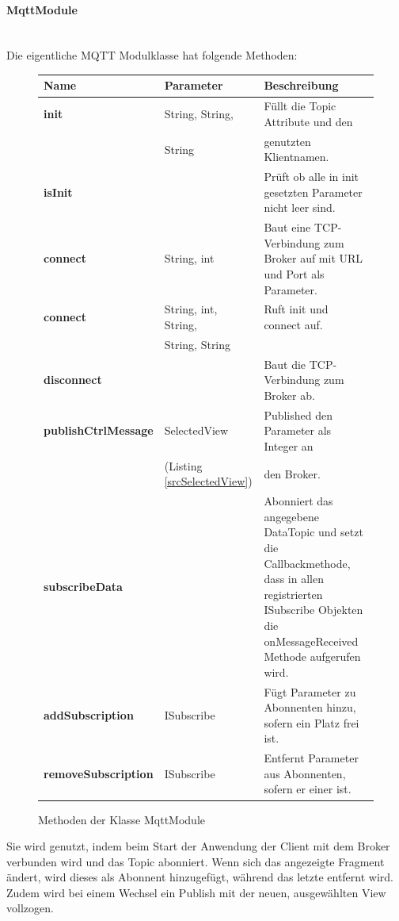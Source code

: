 \documentclass[12pt,oneside]{article}
\begin{document}
  	\paragraph{MqttModule}~\\
  	\label{par:mqtt}
		Die eigentliche MQTT Modulklasse hat folgende Methoden:\par
		\begin{figure}[tph!]
			\begin{tabularx}{\textwidth}{l l X}
				\textbf{Name} & \textbf{Parameter} & \textbf{Beschreibung}\\\hline
				\textbf{init} & String, String, & Füllt die Topic Attribute und den\\
				&  String & genutzten Klientnamen.\\\hline
				\textbf{isInit}&& Prüft ob alle in init gesetzten Parameter nicht leer sind.\\\hline
				\textbf{connect} & String, int & Baut eine TCP-Verbindung zum Broker auf mit URL und Port als Parameter.\\\hline
				\textbf{connect} & String, int, String, & Ruft init und connect auf.\\
				&  String, String &\\\hline
				\textbf{disconnect} && Baut die TCP-Verbindung zum Broker ab.\\\hline
				\textbf{publishCtrlMessage} & SelectedView & Published den Parameter als Integer an\\
				& (Listing \ref{srcSelectedView}) & den Broker.\\\hline
				\textbf{subscribeData} && Abonniert das angegebene DataTopic und setzt die Callbackmethode, dass in allen registrierten ISubscribe Objekten die onMessageReceived Methode aufgerufen wird.\\ \hline
				\textbf{addSubscription} & ISubscribe & Fügt Parameter zu Abonnenten hinzu, sofern ein Platz frei ist.\\\hline
				\textbf{removeSubscription} & ISubscribe & Entfernt Parameter aus Abonnenten, sofern er einer ist.\\
			\end{tabularx}
			\caption{Methoden der Klasse MqttModule}
		\end{figure}  		
  		Sie wird genutzt, indem beim Start der Anwendung der Client mit dem Broker verbunden wird und das Topic abonniert. Wenn sich das angezeigte Fragment ändert, wird dieses als Abonnent hinzugefügt, während das letzte entfernt wird. Zudem wird bei einem Wechsel ein Publish mit der neuen, ausgewählten View vollzogen.
  	  
\end{document}
